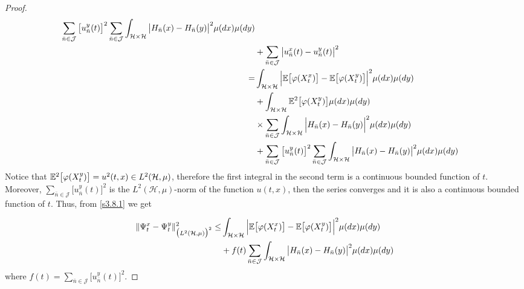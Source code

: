 \documentclass[review, onefignum, onetabnum]{siamart171218}
\begin{document}
\begin{proof}
\begin{equation}
\begin{aligned}
            \sum_{\bar n\in \mathcal{J}} 
            \big[
                u_{\bar n}^y(t)
            \big] ^ 2
            \sum_{\bar n\in \mathcal{J}}
            \int_{\mathcal{H}\times \mathcal{H}}
            \big| 
                H_{\bar n}(x) -H_{\bar n}(y) 
            \big|^2 \mu(dx) \mu(dy)
            \\
            &+
            \sum_{\bar n\in \mathcal{J}} 
                        \big| 
                            u_{\bar n}^x(t)-u_{\bar n}^y(t)
                        \big| ^ 2
            \\
            =&
            \int_{\mathcal{H}\times \mathcal{H}} 
            \Big|
                \mathbb{E}\big[
                    \varphi(X_t^x)
                \big]
                -
                \mathbb{E}\big[
                    \varphi(X_t^y)
                \big] 
            \Big|^2 
            \mu(dx)\mu(dy) 
            \\
            &+
            \int_{\mathcal{H}\times \mathcal{H}} 
            \mathbb{E} ^ 2\big[
                \varphi(X_t^y)
            \big] \mu(dx) \mu(dy)
            \\
            & \times
            \sum_{\bar n\in \mathcal{J}}
            \int_{\mathcal{H}\times \mathcal{H}} 
            \Big|
                H_{\bar n}(x) - H_{\bar n}(y)
            \Big|^2  \mu(dx)\mu(dy)
            \\
            &+  
            \sum_{\bar n\in \mathcal{J}} 
            \big[
                u_{\bar n}^y(t)
            \big]^2
            \sum_{\bar n\in \mathcal{J}}
            \int_{\mathcal{H}\times \mathcal{H}}  
            \big| 
                H_{\bar n}(x) - H_{\bar n}(y) 
            \big|^2 \mu(dx)\mu(dy)
    \end{aligned}
\end{equation}
Notice that $\mathbb{E}^2\big[\varphi(X_t^y)\big]=u^2(t,x)\in L^2(\mathcal{H},\mu)$, 
therefore the first integral in the second term is a continuous bounded 
function of $t$. 
Moreover, $\sum_{\bar n\in \mathcal{J}} \big[u_{\bar n}^y(t)\big]^2$ is the 
$L^2(\mathcal{H},\mu)$-norm of the function $u(t,x)$, then the series 
converges and it is also a continuous bounded function of $t$. Thus, from 
\eqref{s3.8.1} we get

\begin{equation}
\label{s3.9.1}
    \begin{aligned}
        \| \Psi_t^x-\Psi_t^y\|_{\big(L^2(\mathcal{H},\mu) \big)^2}^2
        \le&   
        \int_{\mathcal{H}\times \mathcal{H}} 
            \Big| 
                \E\big [
                    \varphi(X_t^x)
                \big
                ]-
                \E\big[
                    \varphi(X_t^y)
                \big] 
            \Big|^2 
        \mu(dx)\mu(dy) 
        \\
         &+  
         f(t) 
         \sum_{\bar n\in \mathcal{J}}
         \int_{\mathcal{H}\times \mathcal{H}}
            \big| 
                H_{\bar n}(x) - H_{\bar n}(y) 
            \big|^2 \mu(dx)\mu(dy)
    \end{aligned}
\end{equation}
where $f(t)= \sum_{\bar n\in \mathcal{J}} \big[u_{\bar n}^y(t)\big]^2$.


\end{proof}
\end{document}
